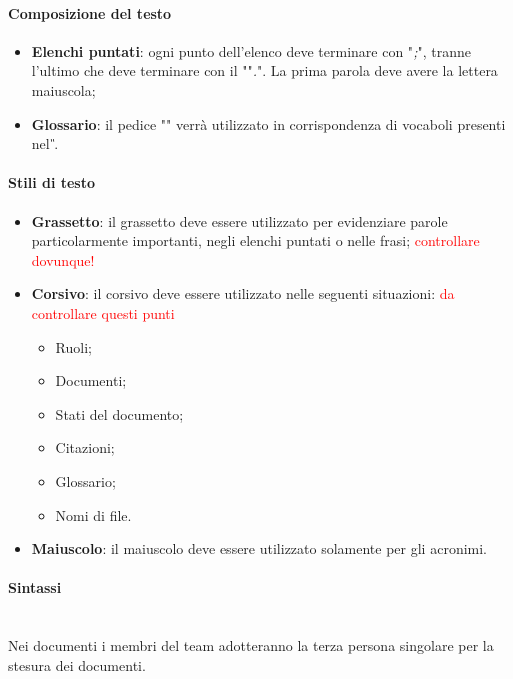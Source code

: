 	\paragraph{Composizione del testo}
	\begin{itemize}
		\item \textbf{Elenchi puntati}: ogni punto dell'elenco deve terminare con "\emph{;}",
		tranne l'ultimo che deve terminare con il ""\emph{.}". La prima parola deve avere la lettera
		maiuscola;
		\item \textbf{Glossario}: il pedice "" verrà utilizzato in corrispondenza di vocaboli presenti nel \textit{\G}.
	\end{itemize}
	\paragraph{Stili di testo}
	\begin{itemize}
		\item \textbf{Grassetto}: il grassetto deve essere utilizzato per evidenziare parole
		particolarmente importanti, negli elenchi puntati o nelle frasi; \textcolor{red}{controllare dovunque!}
		\item \textbf{Corsivo}: il corsivo deve essere utilizzato nelle seguenti
		situazioni: \textcolor{red}{da controllare questi punti}
		\begin{itemize}
			\item Ruoli;
			\item Documenti;
			\item Stati del documento;
			\item Citazioni;
			\item Glossario;
			\item Nomi di file.
		\end{itemize}
		\item \textbf{Maiuscolo}: il maiuscolo deve essere utilizzato solamente per gli acronimi.
	\end{itemize}
	\paragraph{Sintassi}
	~\\Nei documenti i membri del team adotteranno la terza persona singolare per la stesura dei documenti.
